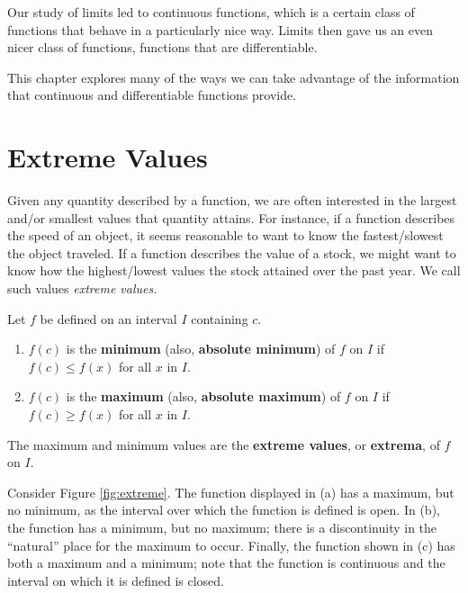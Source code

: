 Our study of limits led to continuous functions, which is a certain class of functions that behave in a particularly nice way. Limits then gave us an even nicer class of functions, functions that are differentiable.

This chapter explores many of the ways we can take advantage of the information that continuous and differentiable functions  provide.

\section{Extreme Values}\label{sec:extreme_values}

\enlargethispage{2\baselineskip}
Given any quantity described by a function, we are often interested in the largest and/or smallest values that quantity attains. For instance, if a function describes the speed of an object, it seems reasonable to want to know the fastest/slowest the object traveled. If a function describes the value of a stock, we might want to know how the highest/lowest values the stock attained over the past year. We call such values \textit{extreme values.}

%
{Let $f$ be defined on an interval $I$ containing $c$.
	\begin{enumerate}
	\item		$f(c)$ is the \textbf{minimum} (also, \textbf{absolute minimum}) of $f$ on $I$ if $f(c) \leq f(x)$ for all $x$ in $I$.
	\item		$f(c)$ is the \textbf{maximum} (also, \textbf{absolute maximum}) of $f$ on $I$ if $f(c) \geq f(x)$ for all $x$ in $I$.
	\end{enumerate}
	The maximum and minimum values are the \textbf{extreme values}, or \textbf{extrema}, of $f$ on $I$.
	}

	

Consider Figure \ref{fig:extreme}. %
 The function displayed in (a) has a maximum, but no minimum, as the interval over which the function is defined is open. In (b), the function has a minimum, but no maximum; there is a discontinuity in the ``natural'' place for the maximum to occur. Finally, the function shown in (c) has both a maximum and a minimum; note that the function is continuous and the interval on which it is defined is closed. 
 
